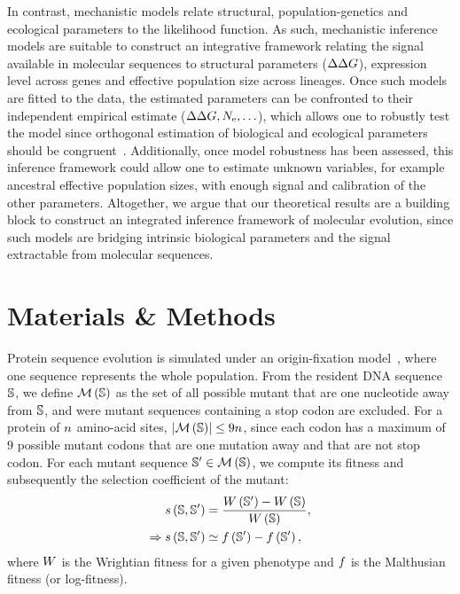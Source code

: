 In contrast, mechanistic models relate structural, population-genetics and ecological parameters to the likelihood function.
As such, mechanistic inference models are suitable to construct an integrative framework relating the signal available in molecular sequences to structural parameters ($\Delta \Delta G$), expression level across genes and effective population size across lineages.
Once such models are fitted to the data, the estimated parameters can be confronted to their independent empirical estimate ($\Delta \Delta G, N_{\text{e}}, \hdots$), which allows one to robustly test the model since orthogonal estimation of biological and ecological parameters should be congruent~\citep{Dasmeh2014}.
Additionally, once model robustness has been assessed, this inference framework could allow one to estimate unknown variables, for example ancestral effective population sizes, with enough signal and calibration of the other parameters.
Altogether, we argue that our theoretical results are a building block to construct an integrated inference framework of molecular evolution, since such models are bridging intrinsic biological parameters and the signal extractable from molecular sequences.


\section{Materials \& Methods}
Protein sequence evolution is simulated under an origin-fixation model~\citep{McCandlish2014}, where one sequence represents the whole population.
From the resident \acrshort{DNA} sequence $\mathbb{S}$, we define $\mathcal{M}\left(\mathbb{S}\right)$ as the set of all possible mutant that are one nucleotide away from $\mathbb{S}$, and were mutant sequences containing a stop codon are excluded.
For a protein of $n$ amino-acid sites, $\left| \mathcal{M}\left(\mathbb{S}\right) \right| \leq 9 n$, since each codon has a maximum of $9$ possible mutant codons that are one mutation away and that are not stop codon.
For each mutant sequence $\mathbb{S}' \in \mathcal{M}\left(\mathbb{S}\right)$, we compute its fitness and subsequently the selection coefficient of the mutant:
\begin{align}
    s \left( \mathbb{S},\mathbb{S}'\right) & = \dfrac{ W \left(\mathbb{S}' \right) - W \left(\mathbb{S}\right) }{ W \left( \mathbb{S}\right)}, \\
    \Rightarrow s \left( \mathbb{S},\mathbb{S}'\right) & \simeq  f \left(\mathbb{S}' \right) -   f \left(\mathbb{S}' \right),
\end{align}
where $W$ is the Wrightian fitness for a given phenotype and $f $ is the Malthusian fitness (or log-fitness).

